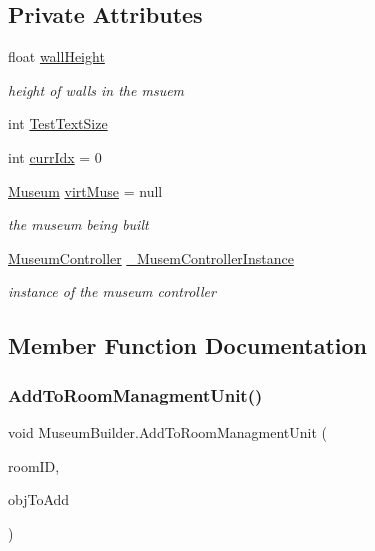 \subsection*{Private Attributes}
\begin{DoxyCompactItemize}
\item 
float \mbox{\hyperlink{class_museum_builder_ae878fab80ac14114029e1fe78877f26a}{wall\+Height}}
\begin{DoxyCompactList}\small\item\em height of walls in the msuem \end{DoxyCompactList}\item 
int \mbox{\hyperlink{class_museum_builder_ade9354ab3c65386fb3ba9c5d5db94a1d}{Test\+Text\+Size}}
\item 
int \mbox{\hyperlink{class_museum_builder_aa8b616ce266d39591cc20f6cc884333b}{curr\+Idx}} = 0
\item 
\mbox{\hyperlink{class_museum}{Museum}} \mbox{\hyperlink{class_museum_builder_a353644d408300bbadf427e0a0971d039}{virt\+Muse}} = null
\begin{DoxyCompactList}\small\item\em the museum being built \end{DoxyCompactList}\item 
\mbox{\hyperlink{class_museum_controller}{Museum\+Controller}} \mbox{\hyperlink{class_museum_builder_ab63ff4582a395d2172a05542dbca8341}{\+\_\+\+Musem\+Controller\+Instance}}
\begin{DoxyCompactList}\small\item\em instance of the museum controller \end{DoxyCompactList}\end{DoxyCompactItemize}


\subsection{Member Function Documentation}
\mbox{\label{class_museum_builder_ad1991ecd1258a2eb6d020d3c429ad9c8}} 
\subsubsection{\texorpdfstring{Add\+To\+Room\+Managment\+Unit()}{AddToRoomManagmentUnit()}}
{\footnotesize\ttfamily void Museum\+Builder.\+Add\+To\+Room\+Managment\+Unit (\begin{DoxyParamCaption}\item[{uint}]{room\+ID,  }\item[{Game\+Object}]{obj\+To\+Add }\end{DoxyParamCaption})\hspace{0.3cm}{\ttfamily [private]}}

